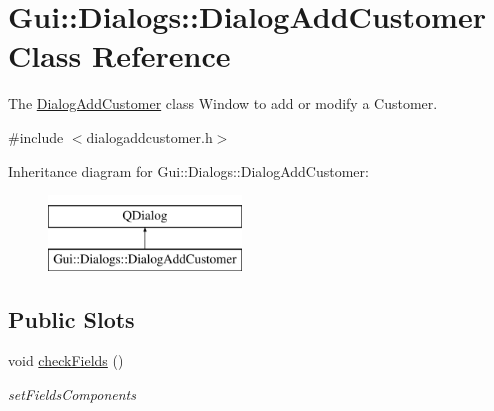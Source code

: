 \hypertarget{classGui_1_1Dialogs_1_1DialogAddCustomer}{\section{Gui\-:\-:Dialogs\-:\-:Dialog\-Add\-Customer Class Reference}
\label{classGui_1_1Dialogs_1_1DialogAddCustomer}
}


The \hyperlink{classGui_1_1Dialogs_1_1DialogAddCustomer}{Dialog\-Add\-Customer} class Window to add or modify a Customer.  




{\ttfamily \#include $<$dialogaddcustomer.\-h$>$}

Inheritance diagram for Gui\-:\-:Dialogs\-:\-:Dialog\-Add\-Customer\-:\begin{figure}[H]
\begin{center}
\leavevmode
\includegraphics[height=2.000000cm]{d2/d50/classGui_1_1Dialogs_1_1DialogAddCustomer}
\end{center}
\end{figure}
\subsection*{Public Slots}
\begin{DoxyCompactItemize}
\item 
\hypertarget{classGui_1_1Dialogs_1_1DialogAddCustomer_ab1c4fdf53139a3aac7243c42881d2af1}{void \hyperlink{classGui_1_1Dialogs_1_1DialogAddCustomer_ab1c4fdf53139a3aac7243c42881d2af1}{check\-Fields} ()}\label{classGui_1_1Dialogs_1_1DialogAddCustomer_ab1c4fdf53139a3aac7243c42881d2af1}

\begin{DoxyCompactList}\small\item\em set\-Fields\-Components \end{DoxyCompactList}\end{DoxyCompactItemize}

